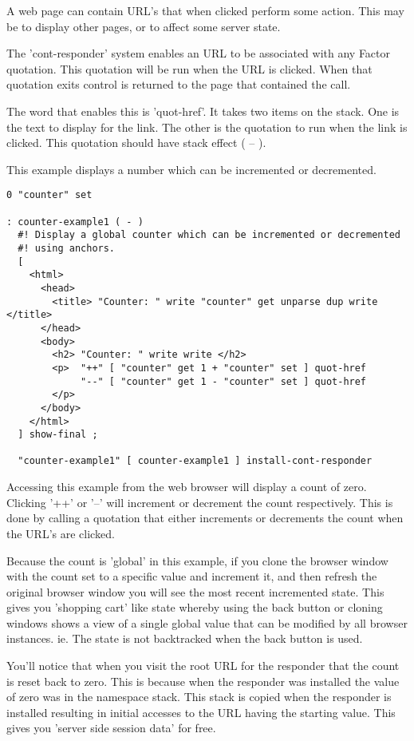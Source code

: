 A web page can contain URL's that when clicked perform some
action. This may be to display other pages, or to affect some server
state. 

The 'cont-responder' system enables an URL to be associated with any
Factor quotation. This quotation will be run when the URL is
clicked. When that quotation exits control is returned to the page
that contained the call. 

The word that enables this is 'quot-href'. It takes two items on the
stack. One is the text to display for the link. The other is the
quotation to run when the link is clicked. This quotation should have
stack effect ( -- ).

This example displays a number which can be incremented or
decremented. 

\begin{verbatim}
0 "counter" set

: counter-example1 ( - )
  #! Display a global counter which can be incremented or decremented
  #! using anchors.
  [
    <html>
      <head> 
        <title> "Counter: " write "counter" get unparse dup write  </title>
      </head>
      <body>
        <h2> "Counter: " write write </h2> 
        <p>  "++" [ "counter" get 1 + "counter" set ] quot-href
             "--" [ "counter" get 1 - "counter" set ] quot-href
        </p>
      </body>
    </html>
  ] show-final ;

  "counter-example1" [ counter-example1 ] install-cont-responder
\end{verbatim}

Accessing this example from the web browser will display a count of
zero. Clicking '++' or '--' will increment or decrement the count
respectively. This is done by calling a quotation that either
increments or decrements the count when the URL's are clicked. 

Because the count is 'global' in this example, if you clone the
browser window with the count set to a specific value and increment
it, and then refresh the original browser window you will see the most
recent incremented state. This gives you 'shopping cart' like state
whereby using the back button or cloning windows shows a view of a
single global value that can be modified by all browser
instances. ie. The state is not backtracked when the back button is
used.

You'll notice that when you visit the root URL for the responder that
the count is reset back to zero. This is because when the responder
was installed the value of zero was in the namespace stack. This stack
is copied when the responder is installed resulting in initial
accesses to the URL having the starting value. This gives you 'server
side session data' for free.

